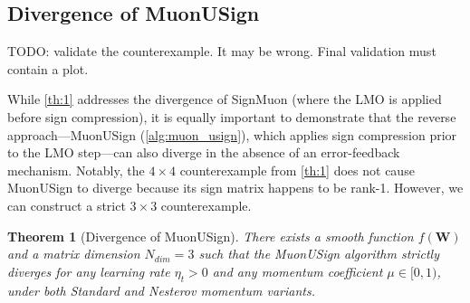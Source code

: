 \documentclass[letterpaper]{article} %
\newtheorem{theorem}{Theorem}
\begin{document}
\subsection{Divergence of MuonUSign}\label{app:proof_th2}
TODO: validate the counterexample. It may be wrong. Final validation must contain a plot.

While \cref{th:1} addresses the divergence of SignMuon (where the LMO is applied before sign compression), it is equally important to demonstrate that the reverse approach—MuonUSign (\cref{alg:muon_usign}), which applies sign compression prior to the LMO step—can also diverge in the absence of an error-feedback mechanism. Notably, the $4 \times 4$ counterexample from \cref{th:1} does not cause MuonUSign to diverge because its sign matrix happens to be rank-1. However, we can construct a strict $3 \times 3$ counterexample.

\begin{theorem}[Divergence of MuonUSign]\label{th:2}
There exists a smooth function $f(\mathbf{W})$ and a matrix dimension $N_{dim} = 3$ such that the MuonUSign algorithm strictly diverges for any learning rate $\eta_t > 0$ and any momentum coefficient $\mu \in [0, 1)$, under both Standard and Nesterov momentum variants.
\end{theorem}
\end{document}
